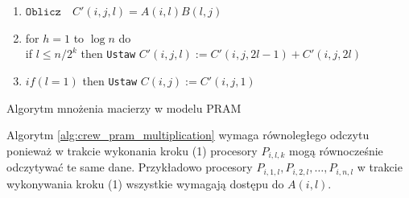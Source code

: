 \label{alg:crew_pram_multiplication}
\begin{algorithm}[H]
\begin{enumerate}
 \item \( \mathtt{Oblicz}\quad C'(i,j,l) = A(i,l)B(l,j) \)
 \item for \(h = 1\) to \( \log{n}\) do\\
 if \(l \leq n/2^k\) then \texttt{Ustaw} \(C'(i,j,l):=C'(i,j,2l-1)+C'(i,j,2l)\)
 \item \(if(l=1)\) then \texttt{Ustaw} \(C(i,j):=C'(i,j,1)\)
\end{enumerate}
\caption{Algorytm mnożenia macierzy w modelu PRAM\label{alg:pram_pseudokod}}
\end{algorithm}

\begin{uwaga}
Algorytm \ref{alg:crew_pram_multiplication} wymaga równoległego odczytu ponieważ w trakcie wykonania kroku (1) procesory \(P_{i,l,k}\) mogą równocześnie odczytywać te same dane. Przykładowo procesory \(P_{i,1,l},P_{i,2,l},\dots,P_{i,n,l}\) w trakcie wykonywania kroku (1) wszystkie wymagają dostępu do \(A(i,l)\).
\end{uwaga}

